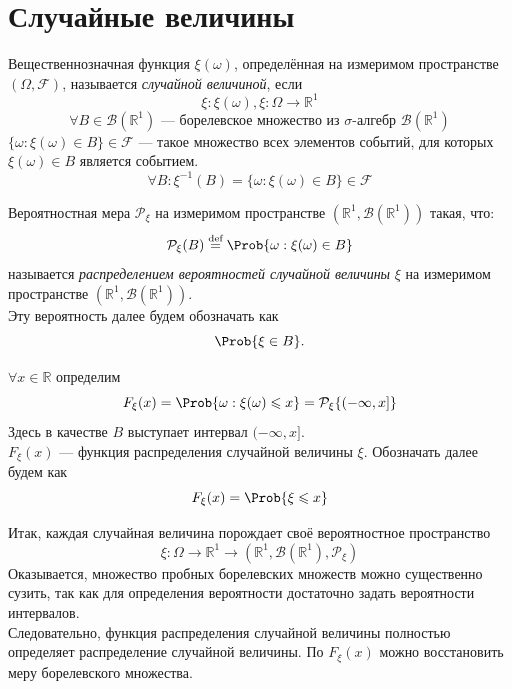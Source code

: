 \section{Случайные величины}
\begin{definition}
	Вещественнозначная функция $\xi (\omega)$, определённая на измеримом пространстве $(\Omega, \mathcal{F})$, называется \textit{случайной величиной}, если
	\[
		\xi: \xi(\omega), \xi : \Omega \rightarrow \mathbb{R}^1
	\]
	\[
		\forall B \in \mathcal{B}(\mathbb{R}^1) \text{ --- борелевское множество из $\sigma$-алгебр $\mathcal{B}(\mathbb{R}^1)$}
	\]
	$\{ \omega : \xi(\omega) \in B \} \in \mathcal{F}$ --- такое множество всех элементов событий, для которых $\xi(\omega) \in B$ является событием.
	\begin{equation}
		\forall B : \xi^{-1}(B) = \{ \omega : \xi(\omega) \in B \} \in \mathcal{F}
	\end{equation}
\end{definition}
\begin{definition}
Вероятностная мера $\mathcal{P}_\xi$ на измеримом пространстве $(\mathbb{R}^1, \mathcal{B}(\mathbb{R}^1))$ такая, что:
\[
	\mathcal{P}_\xi (B) \overset{\textrm{def}}{=} \Prob \{ \omega : \xi (\omega) \in B \}
\]
называется \textit{распределением вероятностей случайной величины} $\xi$ на измеримом пространстве $(\mathbb{R}^1, \mathcal{B}(\mathbb{R}^1))$. \\
Эту вероятность далее будем обозначать как
\[
	\Prob \{ \xi \in B \}.
\]
\end{definition}
\begin{definition}
	$\forall x \in \mathbb{R}$ определим
	\[
		F_\xi (x) = \Prob \{ \omega : \xi (\omega) \leqslant x \} = \mathcal{P}_\xi \{ (-\infty, x] \}
	\]
	Здесь в качестве $B$ выступает интервал $(-\infty, x]$. \\
	$F_\xi (x)$ --- функция распределения случайной величины $\xi$. Обозначать далее будем как
	\[
		F_\xi (x) = \Prob \{ \xi \leqslant x \}
	\]
\end{definition}
Итак, каждая случайная величина порождает своё вероятностное пространство
\[
	\xi : \Omega \rightarrow \mathbb{R}^1 \rightarrow (\mathbb{R}^1, \mathcal{B}(\mathbb{R}^1), \mathcal{P}_\xi)
\]
Оказывается, множество пробных борелевских множеств можно существенно сузить, так как для определения вероятности достаточно задать вероятности интервалов. \\
Следовательно, функция распределения случайной величины полностью определяет распределение случайной величины. По $F_\xi (x)$ можно восстановить меру борелевского множества.\\
